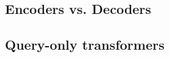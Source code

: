 \subsection {Encoders vs. Decoders}
\label{ss:enc-vs-dec}

\subsection{Query-only transformers}
\label{ss:pure-query}






